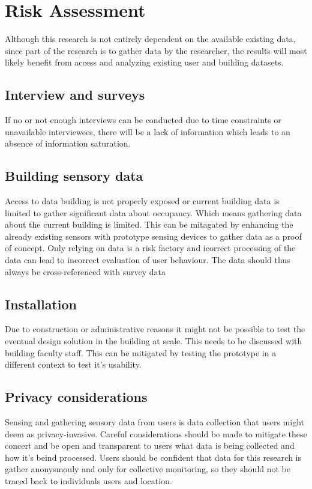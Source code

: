 \section{Risk Assessment}

Although this research is not entirely dependent on the available existing data, since part of the research is to gather data by the researcher, the results will most likely benefit from access and analyzing existing user and building datasets.

\subsection{Interview and surveys}

If no or not enough interviews can be conducted due to time constraints or unavailable interviewees, there will be a lack of information which leads to an absence of information saturation. 

\subsection{Building sensory data}

Access to data building is not properly exposed or current building data is limited to gather significant data about occupancy. Which means gathering data about the current building is limited. This can be mitagated by enhancing the already existing sensors with prototype sensing devices to gather data as a proof of concept. Only relying on data is a risk factory and icorrect processing of the data can lead to incorrect evaluation of user behaviour. The data should thus always be cross-referenced with survey data 

\subsection{Installation}

Due to construction or administrative reasons it might not be possible to test the eventual design solution in the building at scale. This needs to be discussed with building faculty staff. This can be mitigated by testing the prototype in a different context to test it's usability.

\subsection{Privacy considerations}
Sensing and gathering sensory data from users is data collection that users might deem as privacy-invasive. Careful considerations should be made to mitigate these concert and be open and transparent to users what data is being collected and how it's beind processed. Users should be confident that data for this research is gather anonysmouly and only for collective monitoring, so they should not be traced back to individuals users and location.

